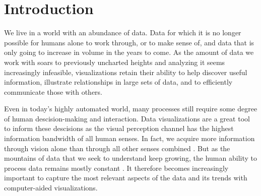 \chapter{Introduction}
\label{chap:introduction}

We live in a world with an abundance of data.
Data for which it is no longer possible for humans alone to work through, or to make sense of, and data that is only going to increase in volume in the years to come.
As the amount of data we work with soars to previously uncharted heights and analyzing it seems increasingly infeasible, visualizations retain their ability to help discover useful information, illustrate relationships in large sets of data, and to efficiently communicate those with others.

Even in today's highly automated world, many processes still require some degree of human descision-making and interaction.
Data visualizations are a great tool to inform these descisions as the visual perception channel has the highest information bandwidth of all human senses.
In fact, we acquire more information through vision alone than through all other senses combined \cite{ware2019information}.
But as the mountains of data that we seek to understand keep growing, the human ability to process data remains mostly constant \cite{dachsbacher2019visualisierung}.
It therefore becomes increasingly important to capture the most relevant aspects of the data and its trends with computer-aided visualizations.






